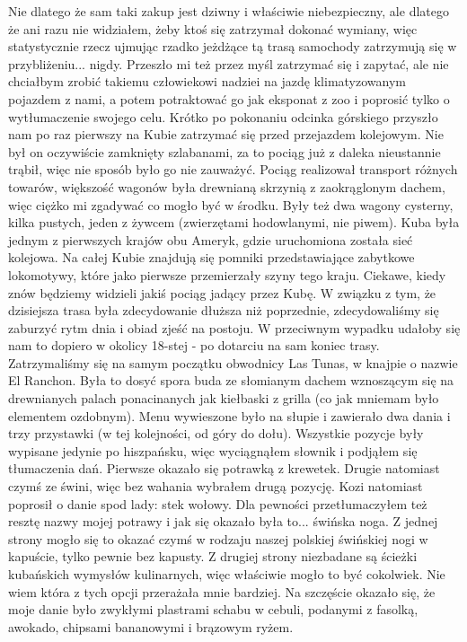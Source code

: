 Nie dlatego że sam taki zakup jest dziwny i właściwie niebezpieczny, ale dlatego że ani razu nie widziałem, żeby ktoś się zatrzymał dokonać wymiany, więc statystycznie rzecz ujmując rzadko jeżdżące tą trasą samochody zatrzymują się w przybliżeniu...
nigdy.
Przeszło mi też przez myśl zatrzymać się i zapytać, ale nie chciałbym zrobić takiemu człowiekowi nadziei na jazdę klimatyzowanym pojazdem z nami, a potem potraktować go jak eksponat z zoo i poprosić tylko o wytłumaczenie swojego celu.
Krótko po pokonaniu odcinka górskiego przyszło nam po raz pierwszy na Kubie zatrzymać się przed przejazdem kolejowym.
Nie był on oczywiście zamknięty szlabanami, za to pociąg już z daleka nieustannie trąbił, więc nie sposób było go nie zauważyć.
Pociąg realizował transport różnych towarów, większość wagonów była drewnianą skrzynią z zaokrąglonym dachem, więc ciężko mi zgadywać co mogło być w środku.
Były też dwa wagony cysterny, kilka pustych, jeden z żywcem (zwierzętami hodowlanymi, nie piwem).
Kuba była jednym z pierwszych krajów obu Ameryk, gdzie uruchomiona została sieć kolejowa.
Na całej Kubie znajdują się pomniki przedstawiające zabytkowe lokomotywy, które jako pierwsze przemierzały szyny tego kraju.
Ciekawe, kiedy znów będziemy widzieli jakiś pociąg jadący przez Kubę.
W związku z tym, że dzisiejsza trasa była zdecydowanie dłuższa niż poprzednie, zdecydowaliśmy się zaburzyć rytm dnia i obiad zjeść na postoju.
W przeciwnym wypadku udałoby się nam to dopiero w okolicy 18-stej - po dotarciu na sam koniec trasy.
Zatrzymaliśmy się na samym początku obwodnicy Las Tunas, w knajpie o nazwie El Ranchon.
Była to dosyć spora buda ze słomianym dachem wznoszącym się na drewnianych palach ponacinanych jak kiełbaski z grilla (co jak mniemam było elementem ozdobnym).
Menu wywieszone było na słupie i zawierało dwa dania i trzy przystawki (w tej kolejności, od góry do dołu).
Wszystkie pozycje były wypisane jedynie po hiszpańsku, więc wyciągnąłem słownik i podjąłem się tłumaczenia dań.
Pierwsze okazało się potrawką z krewetek.
Drugie natomiast czymś ze świni, więc bez wahania wybrałem drugą pozycję.
Kozi natomiast poprosił o danie spod lady: stek wołowy.
Dla pewności przetłumaczyłem też resztę nazwy mojej potrawy i jak się okazało była to...
świńska noga.
Z jednej strony mogło się to okazać czymś w rodzaju naszej polskiej świńskiej nogi w kapuście, tylko pewnie bez kapusty.
Z drugiej strony niezbadane są ścieżki kubańskich wymysłów kulinarnych, więc właściwie mogło to być cokolwiek.
Nie wiem która z tych opcji przerażała mnie bardziej.
Na szczęście okazało się, że moje danie było zwykłymi plastrami schabu w cebuli, podanymi z fasolką, awokado, chipsami bananowymi i brązowym ryżem.
